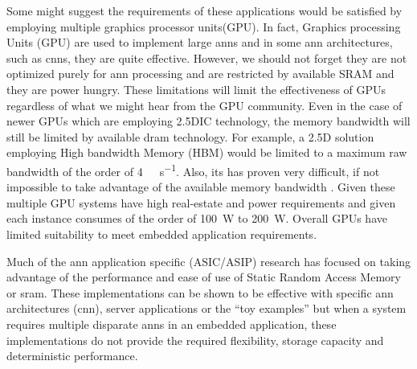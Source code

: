 Some might suggest the requirements of these applications would be satisfied by employing multiple graphics processor units(GPU).
In fact, Graphics processing Units (GPU) are used to implement large \ac{ann}s and in some \ac{ann} architectures, such as \acp{cnn}, they are quite effective. However, we should not forget they are not optimized purely for \ac{ann} processing and are restricted by available SRAM and they are power hungry. These limitations will limit the effectiveness of GPUs regardless of what we might hear from the GPU community.
Even in the case of newer GPUs which are employing 2.5DIC technology, the memory bandwidth will still be limited by available \ac{dram} technology.
For example, a 2.5D solution employing High bandwidth Memory (HBM) would be limited to a maximum raw bandwidth of the order of \SI[per-mode=symbol]{4}{\tera \bit \per \second}.
Also, its has proven very difficult, if not impossible to take advantage of the available memory bandwidth \cite{farabet2011neuflow} \cite{tensorflow2015-whitepaper}.
Given these multiple GPU systems have high real-estate and power requirements and given each instance consumes of the order of \SI{100}{\watt} to \SI{200}{\watt}.
Overall GPUs have limited suitability to meet embedded application requirements.


Much of the \ac{ann} application specific (ASIC/ASIP) research has focused on taking advantage of the performance and ease of use of Static Random Access Memory or \ac{sram}. 
These implementations can be shown to be effective with specific \ac{ann} architectures (\ac{cnn}), server applications or the ``toy examples'' but when a system requires multiple disparate \ac{ann}s in an embedded application, these implementations do not provide the required flexibility, storage capacity and deterministic performance.

\iffalse
How this work addresses the problem are outlined in Section \ref{chap-five}.
\fi
\fi



